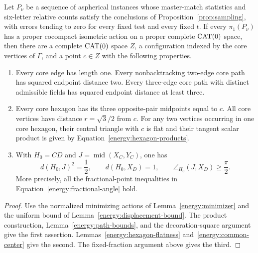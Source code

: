 \begin{proposition}\label{prop:configuration}
Let $P_\nu$ be a sequence of aspherical instances whose master-match
statistics and six-letter relative counts satisfy the conclusions
of Proposition~\ref{prop:sampling}, with errors tending to zero for
every fixed test and every fixed $t$.  If every $\pi_1(P_\nu)$ has
a proper cocompact isometric action on a proper complete $\operatorname{CAT}(0)$
space, then there are a complete $\operatorname{CAT}(0)$ space $Z$, a
configuration indexed by the core vertices of $\Gamma$, and a
point $c\in Z$ with the following properties.
\begin{enumerate}
\item Every core edge has length one.  Every nonbacktracking
two-edge core path has squared endpoint distance two.  Every
three-edge core path with distinct admissible fields has squared
endpoint distance at least three.
\item Every core hexagon has its three opposite-pair midpoints
equal to $c$.  All core vertices have distance $r=\sqrt3/2$ from
$c$.  For any two vertices occurring in one core hexagon, their
central triangle with $c$ is flat and their tangent scalar
product is given by Equation~\eqref{energy:hexagon-products}.
\item With $H_0=CD$ and $J=\operatorname{mid}(X_C,Y_C)$, one has
\[
 d(H_0,J)^2=\frac12,\qquad d(H_0,X_D)=1,
 \qquad \angle_{H_0}(J,X_D)\ge\frac\pi2.
\]
More precisely, all the fractional-point inequalities in
Equation~\eqref{energy:fractional-angle} hold.
\end{enumerate}
\end{proposition}

\begin{proof}
Use the normalized minimizing actions of
Lemma~\ref{energy:minimizer} and the uniform bound of
Lemma~\ref{energy:displacement-bound}.  The product construction,
Lemma~\ref{energy:path-bounds}, and the decoration-square argument
give the first assertion.  Lemmas~\ref{energy:hexagon-flatness}
and~\ref{energy:common-center} give the second.  The fixed-fraction
argument above gives the third.
\end{proof}
